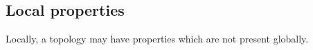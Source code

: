 
\subsection{Local properties}

Locally, a topology may have properties which are not present globally.

